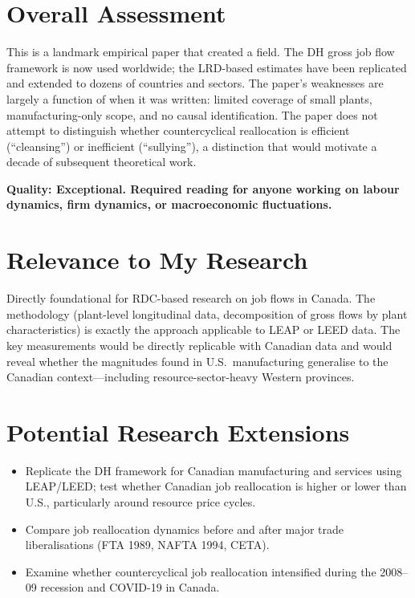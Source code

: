 \section{Overall Assessment}

This is a landmark empirical paper that created a field. The DH gross job flow
framework is now used worldwide; the LRD-based estimates have been replicated
and extended to dozens of countries and sectors. The paper's weaknesses are
largely a function of when it was written: limited coverage of small plants,
manufacturing-only scope, and no causal identification. The paper does not
attempt to distinguish whether countercyclical reallocation is efficient
(``cleansing'') or inefficient (``sullying''), a distinction that would motivate
a decade of subsequent theoretical work.

\textbf{Quality: Exceptional. Required reading for anyone working on labour
dynamics, firm dynamics, or macroeconomic fluctuations.}

\section{Relevance to My Research}

Directly foundational for RDC-based research on job flows in Canada. The
methodology (plant-level longitudinal data, decomposition of gross flows by
plant characteristics) is exactly the approach applicable to LEAP or LEED data.
The key measurements would be directly replicable with Canadian data and would
reveal whether the magnitudes found in U.S.\ manufacturing generalise to the
Canadian context---including resource-sector-heavy Western provinces.

\section{Potential Research Extensions}

\begin{itemize}
  \item Replicate the DH framework for Canadian manufacturing and services
    using LEAP/LEED; test whether Canadian job reallocation is higher or lower
    than U.S., particularly around resource price cycles.
  \item Compare job reallocation dynamics before and after major trade
    liberalisations (FTA 1989, NAFTA 1994, CETA).
  \item Examine whether countercyclical job reallocation intensified during
    the 2008--09 recession and COVID-19 in Canada.
\end{itemize}

